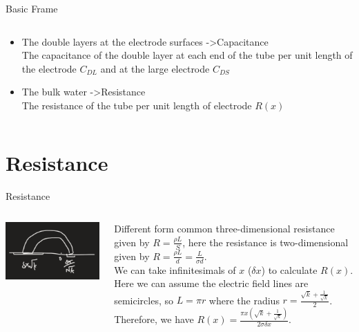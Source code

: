 \documentclass[12pt]{beamer}
\begin{document}
\begin{frame}{Basic Frame}
\begin{columns}[onlytextwidth]
\begin{column}{0.6\textwidth}
\begin{itemize}
                \item The double layers at the electrode surfaces -\textgreater Capacitance\\
                      The capacitance of the double layer at each end of the tube per unit length of the electrode $C_{DL}$ and at the large electrode $C_{DS}$
                \item The bulk water -\textgreater Resistance\\
                      The resistance of the tube per unit length of electrode $R(x)$
            \end{itemize}
        \end{column}
    \end{columns}
\end{frame}
\section{Resistance}
\begin{frame}{Resistance}
    \begin{columns}[onlytextwidth]
        \begin{column}{0.4\textwidth}
            \includegraphics[width=\columnwidth]{2.png}
        \end{column}
        \begin{column}{0.55\textwidth}
            Different form common three-dimensional resistance given by $R=\frac{\rho L}{S}$, here the resistance is two-dimensional given by $R=\frac{\rho L}{d}=\frac{L}{\sigma d}$.\\
            We can take infinitesimals of $x$ ($\delta x$) to calculate $R(x)$. Here we can assume the electric field lines are semicircles, so $L=\pi r$ where the radius $r=\frac{\sqrt{k}+\frac{1}{\sqrt{k}}}{2}$.\\
            Therefore, we have $R(x)=\frac{\pi x\left(\sqrt{k}+\frac{1}{\sqrt{k}}\right)}{2\sigma\delta x}.$
        \end{column}
    \end{columns}
\end{frame}
\end{document}
